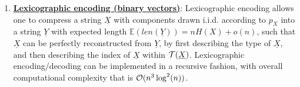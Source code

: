 \documentclass[10pt]{article}
\begin{document}
\begin{enumerate}
\item {\bf \underline{Lexicographic encoding (binary vectors)}}: Lexicographic encoding allows one to compress a string $\underline{X}$ with components drawn i.i.d. according to $p_X$ into a string $\underline{Y}$ with expected length ${\mathbb E}(len(\underline{Y})) = nH(X) + o(n)$, such that $\underline{X}$ can be perfectly reconstructed from $\underline{Y}$, by first describing the type of $\underline{X}$, and then describing the index of $\underline{X}$ within ${\cal T}(\underline{X})$. Lexicographic encoding/decoding can be implemented in a recursive fashion, with overall computational complexity that is ${\cal O}(n^3\log^2(n))$.

\end{enumerate}
\end{document}
